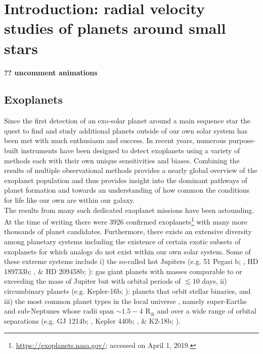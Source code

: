 \chapter[Introduction]{Introduction: radial velocity studies of planets around small stars}

\textbf{?? uncomment animations}

\section{Exoplanets}  \label{sect:exoplanets}
Since the first detection of an exo-solar planet around a main sequence star 
\citep{mayor95}
the quest to find and study additional planets outside of our own solar system 
has been met with much enthusiasm and success. In recent years, numerous 
purpose-built instruments
have been designed to detect exoplanets using a variety of methods each with
their own unique sensitivities and biases. 
Combining the results of multiple observational methods provides a nearly global
overview of the exoplanet population and thus provides insight into
the dominant pathways of planet formation and towards an understanding of how
common the conditions for life like our own are within our galaxy. \\

The results from many such dedicated exoplanet missions have been 
astounding. At the time of writing there were 3926 confirmed 
exoplanets\footnote{\url{https://exoplanets.nasa.gov/}; accessed on April 1, 2019.} 
with many more thousands of planet candidates. Furthermore, there 
exists an extensive diversity among planetary systems including the existence 
of certain exotic subsets of exoplanets for which analogs do not exist within 
our own solar system. Some of these extreme systems include i) the so-called hot 
Jupiters (e.g. 51 Pegasi b; \citealt{mayor95}, HD 189733b; \citealt{bouchy05}, 
\& HD 209458b; \citealt{mazeh99, charbonneau00}): 
gas giant planets with masses comparable to or exceeding the mass of Jupiter  
but with orbital periods of $\lesssim 10$ days, ii) circumbinary planets (e.g. 
Kepler-16b; \citealt{doyle11}): 
planets that orbit stellar binaries, and iii) the most common planet types
in the local universe \citep{petigura13}, namely super-Earths and sub-Neptunes whose
radii span $\sim 1.5-4$ R$_{\oplus}$ and over a wide range of orbital separations
(e.g. GJ 1214b; \citealt{charbonneau09}, Kepler 440b; \citealt{torres15}, \&
K2-18b; \citealt{foremanmackey15a,montet15}).



